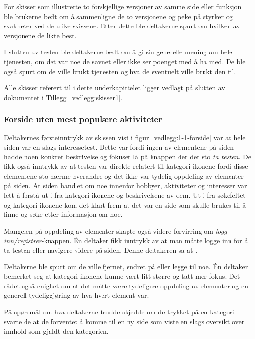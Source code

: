 For skisser som illustrerte to forskjellige versjoner av samme side eller funksjon ble brukerne bedt om å sammenligne de to versjonene og peke på styrker og svakheter ved de ulike skissene. Etter dette ble deltakerne spurt om hvilken av versjonene de likte best.

I slutten av testen ble deltakerne bedt om å gi sin generelle mening om hele tjenesten, om det var noe de savnet eller ikke ser poenget med å ha med. De ble også spurt om de ville brukt tjenesten og hva de eventuelt ville brukt den til.

Alle skisser referert til i dette underkapittelet ligger vedlagt på slutten av dokumentet i Tillegg~\ref{vedlegg:skisser1}.



\subsubsection{Forside uten mest populære aktiviteter}
\label{section:test-forside-1.0}
Deltakernes førsteinntrykk av skissen vist i figur~\ref{vedlegg:1-1-forside} var at hele siden var en slags interessetest. Dette var fordi ingen av elementene på siden hadde noen konkret beskrivelse og fokuset lå på knappen der det sto {\em  ta testen}. De fikk også inntrykk av at testen var direkte relatert til kategori-ikonene fordi disse elementene sto nærme hverandre og det ikke var tydelig oppdeling av elementer på siden. At siden handlet om noe innenfor hobbyer, aktiviteter og interesser var lett å forstå ut i fra kategori-ikonene og beskrivelsene av dem. Ut i fra søkefeltet og kategori-ikonene kom det klart frem at det var en side som skulle brukes til å finne og søke etter informasjon om noe. 

Mangelen på oppdeling av elementer skapte også videre forvirring om {\em  logg inn/registrer}-knappen. Én deltaker fikk inntrykk av at man måtte logge inn for å ta testen eller navigere videre på siden. Denne deltakeren sa at .

Deltakerne ble spurt om de ville fjernet, endret på eller legge til noe. Én deltaker bemerket seg at kategori-ikonene kunne vært litt større og tatt mer fokus. Det rådet også enighet om at det måtte være tydeligere oppdeling av elementer og en generell tydeliggjøring av hva hvert element var.

På spørsmål om hva deltakerne trodde skjedde om de trykket på en kategori svarte de at de forventet å komme til en ny side som viste en slags oversikt over innhold som gjaldt den kategorien.

